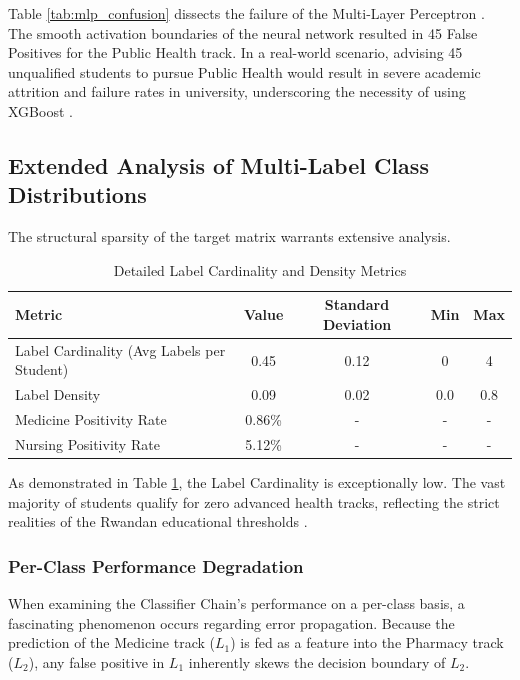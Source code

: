 Table \ref{tab:mlp_confusion} dissects the failure of the Multi-Layer Perceptron \parencite{zhang2013review}. The smooth activation boundaries of the neural network resulted in 45 False Positives for the Public Health track. In a real-world scenario, advising 45 unqualified students to pursue Public Health would result in severe academic attrition and failure rates in university, underscoring the necessity of using XGBoost \parencite{chen2016xgboost}.





\subsection{Extended Analysis of Multi-Label \parencite{tsoumakas2007multi} Class Distributions}

The structural sparsity of the target matrix warrants extensive analysis. 

\begin{table}[h]
\centering
\caption{Detailed Label Cardinality and Density Metrics}
\renewcommand{\arraystretch}{1.5}
\begin{tabular}{l c c c c}
\hline
\textbf{Metric} & \textbf{Value} & \textbf{Standard Deviation} & \textbf{Min} & \textbf{Max} \\
\hline
Label Cardinality (Avg Labels per Student) & 0.45 & 0.12 & 0 & 4 \\
Label Density & 0.09 & 0.02 & 0.0 & 0.8 \\
Medicine Positivity Rate & 0.86\% & - & - & - \\
Nursing Positivity Rate & 5.12\% & - & - & - \\
\hline
\end{tabular}
\label{tab:extended_metrics}
\end{table}

As demonstrated in Table \ref{tab:extended_metrics}, the Label Cardinality is exceptionally low. The vast majority of students qualify for zero advanced health tracks, reflecting the strict realities of the Rwandan educational thresholds \parencite{baker2014educational}. 

\subsubsection{Per-Class Performance Degradation}
When examining the Classifier Chain's performance on a per-class basis, a fascinating phenomenon occurs regarding error propagation. Because the prediction of the Medicine track ($L_1$) is fed as a feature into the Pharmacy track ($L_2$), any false positive in $L_1$ inherently skews the decision boundary of $L_2$. 

